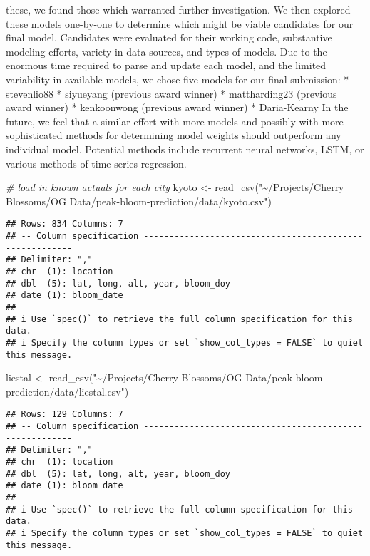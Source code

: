 \documentclass[
]{article}
\newenvironment{Shaded}{\begin{snugshade}}{\end{snugshade}}
\newcommand{\CommentTok}[1]{\textcolor[rgb]{0.56,0.35,0.01}{\textit{#1}}}
\newcommand{\FunctionTok}[1]{\textcolor[rgb]{0.00,0.00,0.00}{#1}}
\newcommand{\NormalTok}[1]{#1}
\newcommand{\OtherTok}[1]{\textcolor[rgb]{0.56,0.35,0.01}{#1}}
\newcommand{\StringTok}[1]{\textcolor[rgb]{0.31,0.60,0.02}{#1}}
\begin{document}
these, we found those which warranted further investigation. We then
explored these models one-by-one to determine which might be viable
candidates for our final model. Candidates were evaluated for their
working code, substantive modeling efforts, variety in data sources, and
types of models. Due to the enormous time required to parse and update
each model, and the limited variability in available models, we chose
five models for our final submission: * stevenlio88 * siyueyang
(previous award winner) * mattharding23 (previous award winner) *
kenkoonwong (previous award winner) * Daria-Kearny In the future, we
feel that a similar effort with more models and possibly with more
sophisticated methods for determining model weights should outperform
any individual model. Potential methods include recurrent neural
networks, LSTM, or various methods of time series regression.

\begin{Shaded}
\begin{Highlighting}[]
\CommentTok{\# load in known actuals for each city}
\NormalTok{kyoto }\OtherTok{\textless{}{-}} \FunctionTok{read\_csv}\NormalTok{(}\StringTok{"\textasciitilde{}/Projects/Cherry Blossoms/OG Data/peak{-}bloom{-}prediction/data/kyoto.csv"}\NormalTok{)}
\end{Highlighting}
\end{Shaded}

\begin{verbatim}
## Rows: 834 Columns: 7
## -- Column specification --------------------------------------------------------
## Delimiter: ","
## chr  (1): location
## dbl  (5): lat, long, alt, year, bloom_doy
## date (1): bloom_date
## 
## i Use `spec()` to retrieve the full column specification for this data.
## i Specify the column types or set `show_col_types = FALSE` to quiet this message.
\end{verbatim}

\begin{Shaded}
\begin{Highlighting}[]
\NormalTok{liestal }\OtherTok{\textless{}{-}} \FunctionTok{read\_csv}\NormalTok{(}\StringTok{"\textasciitilde{}/Projects/Cherry Blossoms/OG Data/peak{-}bloom{-}prediction/data/liestal.csv"}\NormalTok{)}
\end{Highlighting}
\end{Shaded}

\begin{verbatim}
## Rows: 129 Columns: 7
## -- Column specification --------------------------------------------------------
## Delimiter: ","
## chr  (1): location
## dbl  (5): lat, long, alt, year, bloom_doy
## date (1): bloom_date
## 
## i Use `spec()` to retrieve the full column specification for this data.
## i Specify the column types or set `show_col_types = FALSE` to quiet this message.
\end{verbatim}
\end{document}
